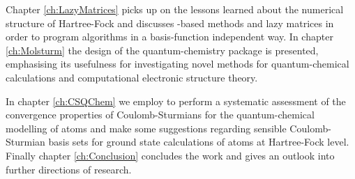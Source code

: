 Chapter \ref{ch:LazyMatrices}
picks up on the lessons learned about the numerical structure
of Hartree-Fock and discusses
\contraction-based methods and lazy matrices
in order to program algorithms
in a basis-function independent way.
In chapter \ref{ch:Molsturm} the design of the quantum-chemistry
package \molsturm is presented,
emphasising its usefulness for investigating novel methods
for quantum-chemical calculations
and computational electronic structure theory.

In chapter \ref{ch:CSQChem} we employ \molsturm
to perform a systematic assessment of
the convergence properties of Coulomb-Sturmians
for the quantum-chemical modelling of atoms
and make some suggestions regarding
sensible Coulomb-Sturmian basis sets for ground state calculations of atoms
at Hartree-Fock level.
Finally chapter \ref{ch:Conclusion} concludes the work and gives
an outlook into further directions of research.
